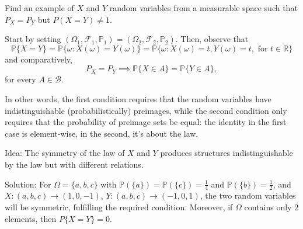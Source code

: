 	\begin{my_ex}
	Find an example of $X$ and $Y$ random variables from a measurable space such that $P_X = P_Y$ but $P(X=Y) \neq 1$.
	\end{my_ex}
	\begin{my_remark}
	Start by setting $(\Omega_1,\mathcal{F}_1,\mathbb{P}_1)=(\Omega_2,\mathcal{F}_2,\mathbb{P}_2)$. Then, observe that
	\[
		\mathbb{P} \{ X = Y \} = \mathbb{P} \{ \omega : X( \omega ) =Y( \omega ) \} = \mathbb{P} \{ \omega : X( \omega ) = t, Y( \omega ) = t, \text{ for } t \in \mathbb{R} \}
	\]
	and comparatively,
	\[
		P_X = P_Y \implies \mathbb{P} \{ X \in A \} = \mathbb{P} \{ Y \in A \},
	\]
	for every $A \in \mathcal{B}$.
	
	In other words, the first condition requires that the random variables have indistinguishable (probabilistically) preimages, while the second condition only requires that the probability of preimage sets be equal: the identity in the first case is element-wise, in the second, it's about the law.
	
	Idea: The symmetry of the law of $X$ and $Y$ produces structures indistinguishable by the law but with different relations.
	
	Solution: For $\Omega = \{a,b,c\}$ with $\mathbb{P}(\{a\})=\mathbb{P}(\{c\})=\frac{1}{4}$ and $\mathbb{P}(\{b\})=\frac{1}{2}$, and $X: (a,b,c)\to(1,0,-1)$, $Y: (a,b,c)\to(-1,0,1)$, the two random variables will be symmetric, fulfilling the required condition. Moreover, if $\Omega$ contains only $2$ elements, then $P\{X=Y\}=0$.
	\end{my_remark}
	
